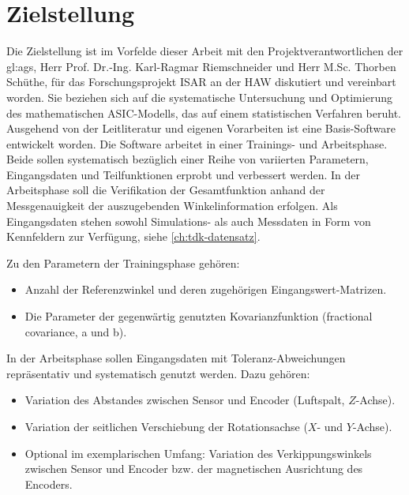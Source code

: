 %

\section{Zielstellung}\label{sec:zielstellung}


Die Zielstellung ist im Vorfelde dieser Arbeit mit den Projektverantwortlichen der \gls{gl:ags}, Herr Prof. Dr.-Ing. Karl-Ragmar Riemschneider und Herr M.Sc. Thorben Schüthe, für das Forschungsprojekt ISAR an der HAW diskutiert und vereinbart worden. Sie beziehen sich auf die systematische Untersuchung und Optimierung des mathematischen ASIC-Modells, das auf einem statistischen Verfahren beruht. Ausgehend von der Leitliteratur \cite{Rasmussen2006} und eigenen Vorarbeiten \cite{Schuethe2019}\cite{Schuethe2020b}\cite{Schuethe2020}\cite{Schuethe2020a} ist eine Basis-Software entwickelt worden. Die Software arbeitet in einer Trainings- und Arbeitsphase. Beide sollen
systematisch bezüglich einer Reihe von variierten Parametern, Eingangsdaten und Teilfunktionen erprobt und verbessert werden. In der Arbeitsphase soll die Verifikation der Gesamtfunktion anhand
der Messgenauigkeit der auszugebenden Winkelinformation erfolgen. Als Eingangsdaten stehen sowohl
Simulations- als auch Messdaten in Form von Kennfeldern zur Verfügung, siehe \autoref{ch:tdk-datensatz}.


Zu den Parametern der Trainingsphase gehören:

\begin{itemize}
	\item Anzahl der Referenzwinkel und deren zugehörigen Eingangswert-Matrizen.
	\item Die Parameter der gegenwärtig genutzten Kovarianzfunktion (fractional covariance, a und b).
\end{itemize}


In der Arbeitsphase sollen Eingangsdaten mit Toleranz-Abweichungen repräsentativ und systematisch
genutzt werden. Dazu gehören:

\begin{itemize}
	\item Variation des Abstandes zwischen Sensor und Encoder (Luftspalt, $Z$-Achse).
	\item Variation der seitlichen Verschiebung der Rotationsachse ($X$- und $Y$-Achse).
	\item Optional im exemplarischen Umfang: Variation des Verkippungswinkels zwischen Sensor und Encoder bzw. der magnetischen Ausrichtung des Encoders.
\end{itemize}

